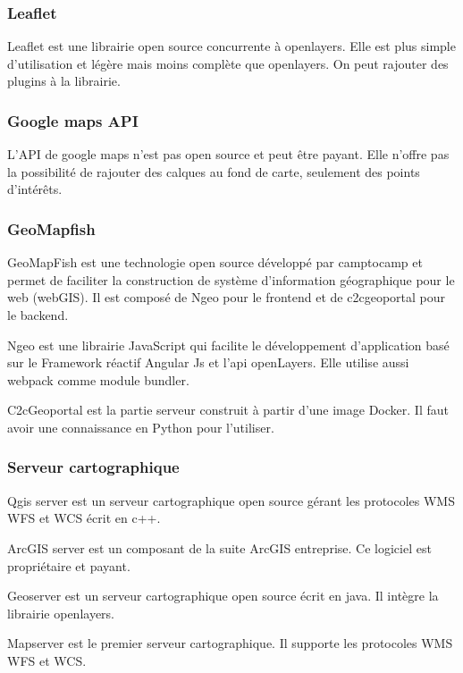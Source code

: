 \documentclass[
    iai, %
    il, %
]{heig-tb}
\begin{document}
\subsubsection{Leaflet}

Leaflet \cite{leaflet} est une librairie open source concurrente à openlayers.
Elle est plus simple d'utilisation et légère mais moins complète que openlayers.
On peut rajouter des plugins à la librairie.

\subsubsection{Google maps API}
L'API de google maps \cite{google-maps} n'est pas open source et peut être payant.
Elle n'offre pas la possibilité de rajouter des calques au fond de carte, seulement des points d'intérêts.

\subsubsection{GeoMapfish}
GeoMapFish est une technologie open source développé par camptocamp et permet de faciliter la construction de système d'information géographique pour le web (webGIS).
Il est composé de Ngeo pour le frontend \cite{ngeo} et de c2cgeoportal \cite{c2cgeoportal} pour le backend.

Ngeo est une librairie JavaScript qui facilite le développement d'application basé sur le Framework réactif Angular Js et l'api openLayers.
Elle utilise aussi webpack comme module bundler.

C2cGeoportal est la partie serveur construit à partir d'une image Docker. Il faut avoir une connaissance en Python pour l'utiliser.

\subsubsection{Serveur cartographique}
Qgis server \cite{qgis} est un serveur cartographique open source gérant les protocoles WMS WFS et WCS écrit en c++.

ArcGIS server \cite{arcgis} est un composant de la suite ArcGIS entreprise. Ce logiciel est propriétaire et payant.

Geoserver \cite{geoserver} est un serveur cartographique open source écrit en java. Il intègre la librairie openlayers.

Mapserver \cite{mapserver} est le premier serveur cartographique. Il supporte les protocoles WMS WFS et WCS.
\end{document}
